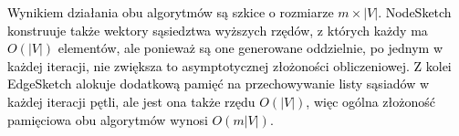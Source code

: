      \textcolor{black}{Wynikiem działania obu algorytmów są szkice o rozmiarze $m \times |V|$. NodeSketch konstruuje także wektory sąsiedztwa wyższych rzędów, z których każdy ma $O(|V|)$ elementów, ale ponieważ są one generowane oddzielnie, po jednym w każdej iteracji, nie zwiększa to asymptotycznej złożoności obliczeniowej. Z kolei EdgeSketch alokuje dodatkową pamięć na przechowywanie listy sąsiadów w każdej iteracji pętli, ale jest ona także rzędu $O(|V|)$, więc ogólna złożoność pamięciowa obu algorytmów wynosi $O(m|V|)$.}